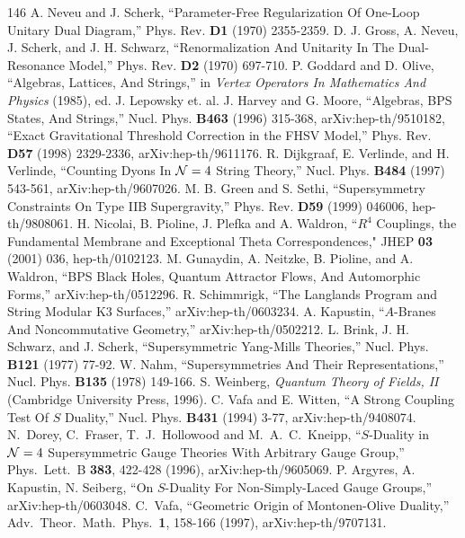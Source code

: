 \begin{thebibliography}{146}
 A. Neveu and J. Scherk, ``Parameter-Free Regularization Of One-Loop Unitary Dual Diagram,'' Phys. Rev. \textbf{D1} (1970) 2355-2359.
 D. J. Gross, A. Neveu, J. Scherk, and J. H. Schwarz, ``Renormalization And Unitarity In The Dual-Resonance Model,'' Phys. Rev. \textbf{D2} (1970) 697-710.
 P. Goddard and D. Olive, ``Algebras, Lattices, And Strings,'' in \emph{Vertex Operators In Mathematics And Physics} (1985), ed. J. Lepowsky et. al.
 J. Harvey and G. Moore, ``Algebras, BPS States, And Strings,'' Nucl. Phys. \textbf{B463} (1996) 315-368, arXiv:hep-th/9510182, ``Exact Gravitational Threshold Correction in the FHSV Model,'' Phys. Rev. \textbf{D57} (1998) 2329-2336, arXiv:hep-th/9611176.
 R. Dijkgraaf, E. Verlinde, and H. Verlinde, ``Counting Dyons In ${{\mathcal{N}}}=4$ String Theory,'' Nucl. Phys. \textbf{B484} (1997) 543-561, arXiv:hep-th/9607026.
 M. B. Green and S. Sethi, ``Supersymmetry Constraints On Type IIB Supergravity,'' Phys. Rev. \textbf{D59} (1999) 046006, hep-th/9808061.
 H. Nicolai, B. Pioline, J. Plefka and A. Waldron, ``$R^4$ Couplings, the Fundamental Membrane and Exceptional Theta Correspondences," JHEP \textbf{03} (2001) 036, hep-th/0102123.
 M. Gunaydin, A. Neitzke, B. Pioline, and A. Waldron, ``BPS Black Holes, Quantum Attractor Flows, And Automorphic Forms,'' arXiv:hep-th/0512296.
 R. Schimmrigk, ``The Langlands Program and String Modular K3 Surfaces,'' arXiv:hep-th/0603234.
 A. Kapustin, ``$A$-Branes And Noncommutative Geometry,'' arXiv:hep-th/0502212.
 L. Brink, J. H. Schwarz, and J. Scherk, ``Supersymmetric Yang-Mills Theories,'' Nucl. Phys. \textbf{B121} (1977) 77-92.
 W. Nahm, ``Supersymmetries And Their Representations,'' Nucl. Phys. \textbf{B135} (1978) 149-166.
 S. Weinberg, \emph{Quantum Theory of Fields, II} (Cambridge University Press, 1996).
 C. Vafa and E. Witten, ``A Strong Coupling Test Of $S$ Duality,'' Nucl. Phys. \textbf{B431} (1994) 3-77, arXiv:hep-th/9408074.
 N.~Dorey, C.~Fraser, T.~J.~Hollowood and M.~A.~C.~Kneipp, ``$S$-Duality in ${{\mathcal{N}}}=4$ Supersymmetric Gauge Theories With Arbitrary Gauge Group,'' Phys.\ Lett.\ B \textbf{383}, 422-428 (1996), arXiv:hep-th/9605069.
 P. Argyres, A. Kapustin, N. Seiberg, ``On $S$-Duality For Non-Simply-Laced Gauge Groups,'' arXiv:hep-th/0603048.
 C.~Vafa, ``Geometric Origin of Montonen-Olive Duality,'' Adv.\ Theor.\ Math.\ Phys.\ \textbf{1}, 158-166 (1997), arXiv:hep-th/9707131.

\end{thebibliography}

